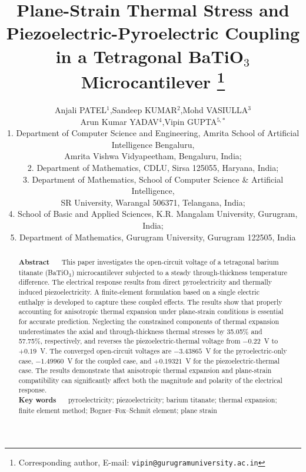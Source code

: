\documentclass[a4paper, 11pt, twoside]{article}
\begin{document}
\title{{\large \textbf{Plane-Strain Thermal Stress and Piezoelectric-Pyroelectric Coupling in a Tetragonal BaTiO$_3$ Microcantilever}}%
\thanks{\footnotesize Corresponding author, E-mail: \texttt{vipin@gurugramuniversity.ac.in}}}
\author{\small{Anjali PATEL$^1$,\quad Sandeep KUMAR$^2$,\quad Mohd VASIULLA$^3$}
\\[1mm]
\small{Arun Kumar YADAV$^4$,\quad Vipin GUPTA$^{5,*}$}
\\[2mm]
\footnotesize{1. Department of Computer Science and Engineering, Amrita School of Artificial Intelligence Bengaluru,}
\\
\footnotesize{Amrita Vishwa Vidyapeetham, Bengaluru, India;}
\\
\footnotesize{2. Department of Mathematics, CDLU, Sirsa 125055, Haryana, India;}
\\
\footnotesize{3. Department of Mathematics, School of Computer Science \& Artificial Intelligence,}
\\
\footnotesize{SR University, Warangal 506371, Telangana, India;}
\\
\footnotesize{4. School of Basic and Applied Sciences, K.R. Mangalam University, Gurugram, India;}
\\
\footnotesize{5. Department of Mathematics, Gurugram University, Gurugram 122505, India}
\\[2mm]}

\maketitle
\thispagestyle{first} \footnotesize
\begin{abstract}
\noindent \textbf{Abstract~~~}This paper investigates the open-circuit voltage of a tetragonal barium titanate (BaTiO$_3$) microcantilever subjected to a steady through-thickness temperature difference. The electrical response results from direct pyroelectricity and thermally induced piezoelectricity. A finite-element formulation based on a single electric enthalpy is developed to capture these coupled effects. The results show that properly accounting for anisotropic thermal expansion under plane-strain conditions is essential for accurate prediction. Neglecting the constrained components of thermal expansion underestimates the axial and through-thickness thermal stresses by 35.05\% and 57.75\%, respectively, and reverses the piezoelectric-thermal voltage from $-0.22$~V to $+0.19$~V. The converged open-circuit voltages are $-3.43865$~V for the pyroelectric-only case, $-1.49960$~V for the coupled case, and $+0.19321$~V for the piezoelectric-thermal case. The results demonstrate that anisotropic thermal expansion and plane-strain compatibility can significantly affect both the magnitude and polarity of the electrical response.
\\[2mm]
\textbf{Key words~~~}pyroelectricity; piezoelectricity; barium titanate; thermal expansion; finite element method; Bogner--Fox--Schmit element; plane strain
\end{abstract}
\end{document}
